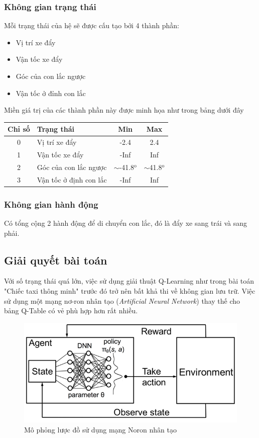 \documentclass[12pt,a4paper]{report}
\begin{document}
\subsubsection{Không gian trạng thái}
Mỗi trạng thái của hệ sẽ được cấu tạo bởi 4 thành phần:
\begin{itemize}
	\item Vị trí xe đẩy
	\item Vận tốc xe đẩy
	\item Góc của con lắc ngược
	\item Vận tốc ở đỉnh con lắc
\end{itemize}
Miền giá trị của các thành phần này được minh họa như trong bảng dưới đây
\begin{center}
	\begin{tabular}{|c|l|c|c|}
		\hline
		\textbf{Chỉ số} & \textbf{Trạng thái} & \textbf{Min} & \textbf{Max} \\
		\hline
		0 & Vị trí xe đẩy & -2.4 & 2.4 \\
		\hline
		1 & Vận tốc xe đẩy & -Inf & Inf \\
		\hline
		2 & Góc của con lắc ngược & $\sim$-41.8$^\text{o}$ & $\sim$41.8$^\text{o}$ \\
		\hline
		3 & Vận tốc ở định con lắc & -Inf & Inf \\
		\hline
	\end{tabular}
\end{center}
\subsubsection{Không gian hành động}
Có tổng cộng 2 hành động để di chuyển con lắc, đó là đẩy xe sang trái và sang phải.
\subsection{Giải quyết bài toán}
Với số trạng thái quá lớn, việc sử dụng giải thuật Q-Learning như trong bài toán "Chiếc
taxi thông minh" trước đó trở nên bất khả thi về không gian lưu trữ. Việc sử dụng một mạng
nơ-ron nhân tạo (\textit{Artificial Neural Network}) thay thế cho bảng Q-Table có vẻ phù hợp hơn
rất nhiều. 
\begin{figure}[h]
	\centering
	\includegraphics[scale=.6]{15}
	\caption{Mô phỏng lược đồ sử dụng mạng Noron nhân tạo}
\end{figure}
\end{document}
